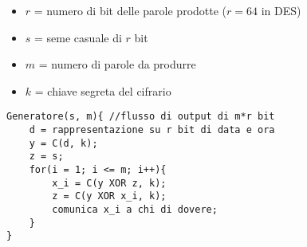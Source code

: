 \begin{itemize}
    \item $r$ = numero di bit delle parole prodotte ($r=64$ in DES)
    \item $s$ = seme casuale di $r$ bit
    \item $m$ = numero di parole da produrre
    \item $k$ = chiave segreta del cifrario
\end{itemize}

\begin{verbatim}
Generatore(s, m){ //flusso di output di m*r bit
    d = rappresentazione su r bit di data e ora
    y = C(d, k);
    z = s;
    for(i = 1; i <= m; i++){
        x_i = C(y XOR z, k);
        z = C(y XOR x_i, k);
        comunica x_i a chi di dovere;
    }
}
\end{verbatim}
